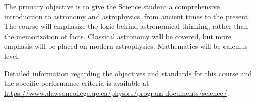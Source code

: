 {The primary objective is to give the Science student a comprehensive introduction to astronomy and astrophysics, from ancient times to the present. The course will emphasize the logic behind astronomical thinking, rather than the memorization of facts. Classical astronomy will be covered, but more emphasis will be placed on modern astrophysics. Mathematics will be calculus-level.
\smallskip

Detailed information regarding the objectives and standards for this course and the specific performance criteria is available at \url{https://www.dawsoncollege.qc.ca/physics/program-documents/science/}.}
